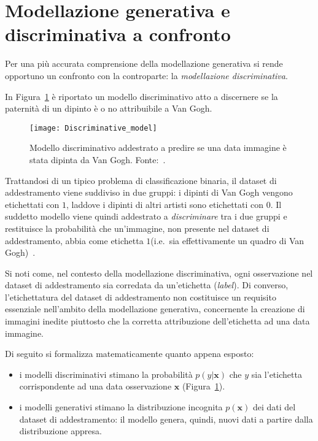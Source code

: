 \section{Modellazione generativa e discriminativa a confronto} 



Per una più accurata comprensione della modellazione generativa si rende opportuno un confronto con la controparte: la \emph{modellazione discriminativa}.

In Figura~\ref{fig:discr_model} è riportato un modello discriminativo atto a 
discernere se la paternità di un dipinto è o no attribuibile a Van Gogh. 
\begin{figure}
    \centering
    \texttt{[image: Discriminative\_model]}
    \caption{Modello discriminativo addestrato a predire se una data immagine è stata dipinta da Van Gogh. Fonte:~\cite{fosterGenerativeDeepLearning2023}.}
    \label{fig:discr_model}
\end{figure}
Trattandosi di un tipico problema di classificazione binaria, il dataset di addestramento viene suddiviso in due gruppi:
i dipinti di Van Gogh vengono etichettati con $1$, laddove i dipinti di altri artisti sono etichettati con $0$. 
Il suddetto modello viene quindi addestrato a \emph{discriminare} tra i due gruppi e restituisce la probabilità 
che un'immagine, non presente nel dataset di addestramento, abbia come etichetta $1$(i.e.\ sia effettivamente un quadro di Van Gogh)~\cite{fosterGenerativeDeepLearning2023}.

\noindent Si noti come, nel contesto della modellazione discriminativa, ogni osservazione nel dataset di addestramento sia corredata da un'etichetta (\emph{label}).
Di converso, l'etichettatura del dataset di addestramento non costituisce un requisito essenziale nell'ambito della modellazione generativa, concernente la 
creazione di immagini inedite piuttosto che la corretta attribuzione dell'etichetta ad una data immagine.

\bigskip
\noindent Di seguito si formalizza matematicamente quanto appena esposto:
\begin{itemize}
\item i modelli discriminativi stimano la probabilità $p(y|\mathbf{x})$ che $y$ sia l'etichetta corrispondente ad una data osservazione $\mathbf{x}$ (Figura~\ref{fig:discr_model}).
\item i modelli generativi stimano la distribuzione incognita $p(\mathbf{x})$ dei dati del dataset di addestramento: il modello genera, quindi, nuovi dati a partire dalla distribuzione appresa.
\end{itemize}



